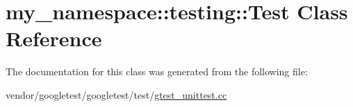\hypertarget{classmy__namespace_1_1testing_1_1Test}{}\section{my\+\_\+namespace\+:\+:testing\+:\+:Test Class Reference}
\label{classmy__namespace_1_1testing_1_1Test}


The documentation for this class was generated from the following file\+:\begin{DoxyCompactItemize}
\item 
vendor/googletest/googletest/test/\hyperlink{gtest__unittest_8cc}{gtest\+\_\+unittest.\+cc}\end{DoxyCompactItemize}
